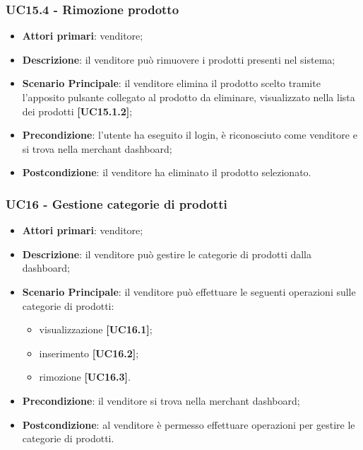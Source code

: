 \subsubsection{UC15.4 - Rimozione prodotto}
\begin{itemize}
\item \textbf{Attori primari}: venditore;
\item \textbf{Descrizione}: il venditore può rimuovere i prodotti presenti nel sistema;
\item \textbf{Scenario Principale}: il venditore elimina il prodotto scelto tramite l'apposito pulsante collegato al prodotto da eliminare, visualizzato nella lista dei prodotti \textbf{[UC15.1.2]};
\item \textbf{Precondizione}: l'utente ha eseguito il login, è riconosciuto come venditore e si trova nella merchant dashboard;
\item \textbf{Postcondizione}: il venditore ha eliminato il prodotto selezionato.
\end{itemize}

\subsubsection{UC16 - Gestione categorie di prodotti}
\begin{itemize}
\item \textbf{Attori primari}: venditore;
\item \textbf{Descrizione}: il venditore può gestire le categorie di prodotti dalla dashboard;
\item \textbf{Scenario Principale}: il venditore può effettuare le seguenti operazioni sulle categorie di prodotti:
\begin{itemize}
	\item visualizzazione \textbf{[UC16.1]};
	\item inserimento \textbf{[UC16.2]};
	\item rimozione \textbf{[UC16.3]}.
\end{itemize}
\item \textbf{Precondizione}: il venditore si trova nella merchant dashboard;
\item \textbf{Postcondizione}: al venditore è permesso effettuare operazioni per gestire le categorie di prodotti.
\end{itemize}

